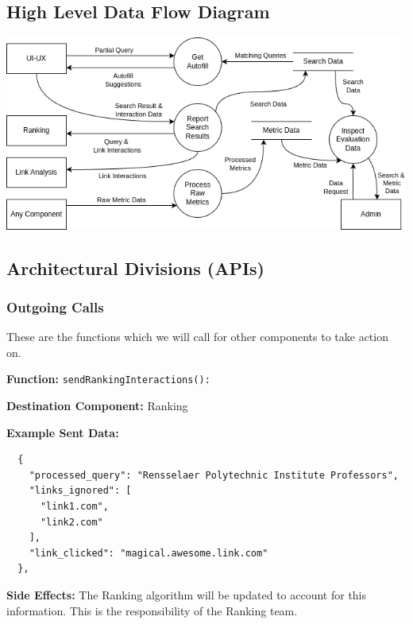 \subsection*{High Level Data Flow Diagram}

\begin{center}
  \includegraphics[scale=0.65]{DFDs/HighLevelDFD.drawio.png}
\end{center}

\subsection*{Architectural Divisions (APIs)}

\subsubsection*{Outgoing Calls}
These are the functions which we will call for other components to take action on.

\medskip

\textbf{Function:} \verb|sendRankingInteractions():|

\smallskip

\textbf{Destination Component:} Ranking

\smallskip

\textbf{Example Sent Data:} \begin{verbatim}
  {
    "processed_query": "Rensselaer Polytechnic Institute Professors",
    "links_ignored": [
      "link1.com",
      "link2.com"
    ],
    "link_clicked": "magical.awesome.link.com"
  },
\end{verbatim}

\smallskip

\textbf{Side Effects:} The Ranking algorithm will be updated to account for this information. This is the responsibility of the Ranking team.

\bigskip

